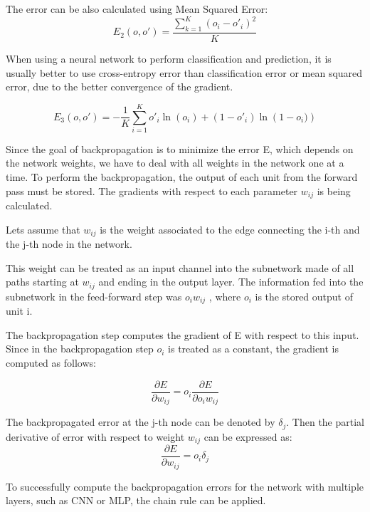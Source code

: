 The error can be also calculated using Mean Squared Error: 
\begin{equation}
E_{2}(o,o') = \frac{\sum_{k=1}^{K}(o_{i} - o'_{i})^2}{K}
\end{equation}


When using a neural network to perform classification and prediction, it is usually better to use cross-entropy error than classification error or mean squared error, due to the better convergence of the gradient.

\begin{equation}
E_{3}(o, o') = -\frac{1}{K} \sum_{i=1}^K o'_{i} \ln(o_{i}) + \left(1 - o'_{i}\right) \ln \left(1 - o_{i})\right)
\end{equation} 


Since the goal of backpropagation is to minimize the error E, which depends on the network weights, we have to deal with all weights in the network one at a time.
To perform the backpropagation, the output of each unit from the forward pass must be stored. The gradients with respect to each parameter $w_{ij}$ is being calculated.

Lets assume that $w_{ij}$ is the weight associated to the edge connecting the i-th and the j-th node in the network.

This weight can be treated as an input channel into the subnetwork made of all paths starting at $w_{ij}$ and ending in the output layer. The information fed into the subnetwork in the feed-forward step was $o_i w_{ij}$ , where $o_i$ is the stored output of unit i.

The backpropagation step computes the gradient of E with respect to this input. Since in the backpropagation step $o_i$ is treated as a constant, the gradient is computed as follows:

\begin{equation}
\frac{\partial E}{\partial w_{ij}} = o_i \frac{\partial E}{\partial o_i w_{ij}}
\end{equation}

The backpropagated error at the j-th node can be denoted by $\delta_j$. Then the partial derivative of error with respect to weight $w_{ij}$ can be expressed as:
\begin{equation}
\frac{\partial E}{\partial w_{ij}} = o_i \delta_j
\end{equation}


To successfully compute the backpropagation errors for the network with multiple layers, such as CNN or MLP, the chain rule can be applied.

